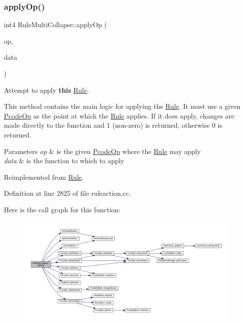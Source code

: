 \subsubsection{\texorpdfstring{applyOp()}{applyOp()}}
{\footnotesize\ttfamily int4 Rule\+Multi\+Collapse\+::apply\+Op (\begin{DoxyParamCaption}\item[{\mbox{\hyperlink{class_pcode_op}{Pcode\+Op}} $\ast$}]{op,  }\item[{\mbox{\hyperlink{class_funcdata}{Funcdata}} \&}]{data }\end{DoxyParamCaption})\hspace{0.3cm}{\ttfamily [virtual]}}



Attempt to apply {\bfseries{this}} \mbox{\hyperlink{class_rule}{Rule}}. 

This method contains the main logic for applying the \mbox{\hyperlink{class_rule}{Rule}}. It must use a given \mbox{\hyperlink{class_pcode_op}{Pcode\+Op}} as the point at which the \mbox{\hyperlink{class_rule}{Rule}} applies. If it does apply, changes are made directly to the function and 1 (non-\/zero) is returned, otherwise 0 is returned. 
\begin{DoxyParams}{Parameters}
{\em op} & is the given \mbox{\hyperlink{class_pcode_op}{Pcode\+Op}} where the \mbox{\hyperlink{class_rule}{Rule}} may apply \\
\hline
{\em data} & is the function to which to apply \\
\hline
\end{DoxyParams}


Reimplemented from \mbox{\hyperlink{class_rule_a4e3e61f066670175009f60fb9dc60848}{Rule}}.



Definition at line 2825 of file ruleaction.\+cc.

Here is the call graph for this function\+:
\nopagebreak
\begin{figure}[H]
\begin{center}
\leavevmode
\includegraphics[width=350pt]{class_rule_multi_collapse_a65f32f0c3dfaad6ba711cb1c9dc72954_cgraph}
\end{center}
\end{figure}
\mbox{\label{class_rule_multi_collapse_a6aceb3f6d65434184d65727bdc6da79e}} 
